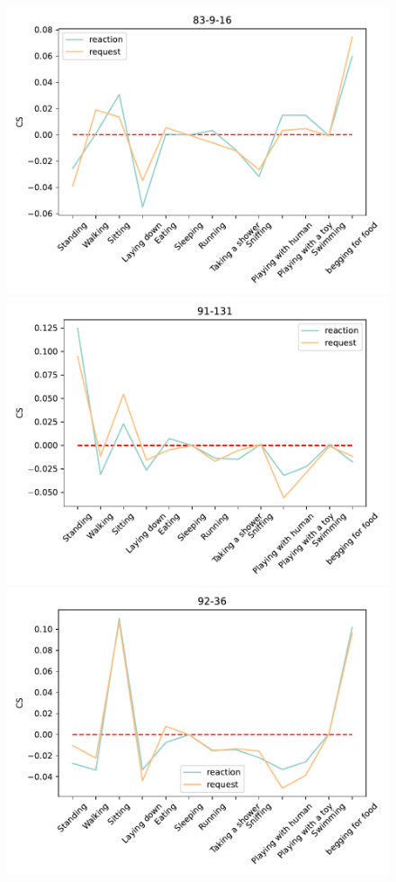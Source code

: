 \begin{figure}[ht]
		\begin{minipage}[b]{.3\linewidth}
			\centering
			\includegraphics[width=0.99\linewidth]{./35word/83-9-16.pdf}
		\end{minipage}
		\begin{minipage}[b]{.3\linewidth}
			\centering
			\includegraphics[width=0.99\linewidth]{./35word/91-131.pdf}
		\end{minipage}
		\begin{minipage}[b]{.3\linewidth}
			\centering
			\includegraphics[width=0.99\linewidth]{./35word/92-36.pdf}

\end{minipage}
\end{figure}
